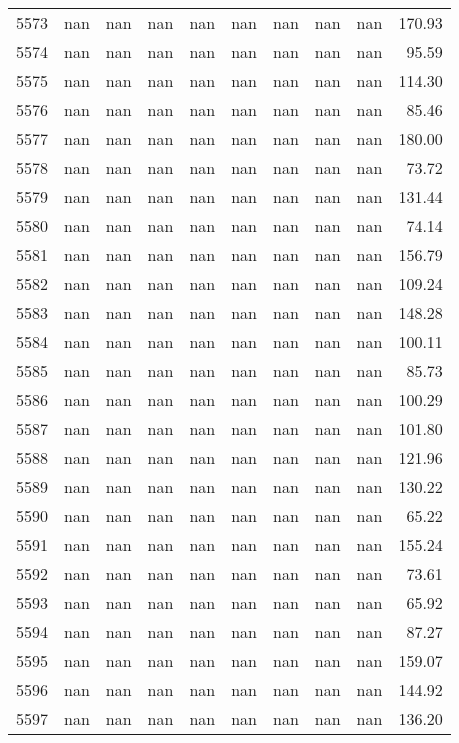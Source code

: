\begin{tabular}{lrrrrrrrrr}
5573 & nan & nan & nan & nan & nan & nan & nan & nan & 170.93 \\
5574 & nan & nan & nan & nan & nan & nan & nan & nan & 95.59 \\
5575 & nan & nan & nan & nan & nan & nan & nan & nan & 114.30 \\
5576 & nan & nan & nan & nan & nan & nan & nan & nan & 85.46 \\
5577 & nan & nan & nan & nan & nan & nan & nan & nan & 180.00 \\
5578 & nan & nan & nan & nan & nan & nan & nan & nan & 73.72 \\
5579 & nan & nan & nan & nan & nan & nan & nan & nan & 131.44 \\
5580 & nan & nan & nan & nan & nan & nan & nan & nan & 74.14 \\
5581 & nan & nan & nan & nan & nan & nan & nan & nan & 156.79 \\
5582 & nan & nan & nan & nan & nan & nan & nan & nan & 109.24 \\
5583 & nan & nan & nan & nan & nan & nan & nan & nan & 148.28 \\
5584 & nan & nan & nan & nan & nan & nan & nan & nan & 100.11 \\
5585 & nan & nan & nan & nan & nan & nan & nan & nan & 85.73 \\
5586 & nan & nan & nan & nan & nan & nan & nan & nan & 100.29 \\
5587 & nan & nan & nan & nan & nan & nan & nan & nan & 101.80 \\
5588 & nan & nan & nan & nan & nan & nan & nan & nan & 121.96 \\
5589 & nan & nan & nan & nan & nan & nan & nan & nan & 130.22 \\
5590 & nan & nan & nan & nan & nan & nan & nan & nan & 65.22 \\
5591 & nan & nan & nan & nan & nan & nan & nan & nan & 155.24 \\
5592 & nan & nan & nan & nan & nan & nan & nan & nan & 73.61 \\
5593 & nan & nan & nan & nan & nan & nan & nan & nan & 65.92 \\
5594 & nan & nan & nan & nan & nan & nan & nan & nan & 87.27 \\
5595 & nan & nan & nan & nan & nan & nan & nan & nan & 159.07 \\
5596 & nan & nan & nan & nan & nan & nan & nan & nan & 144.92 \\
5597 & nan & nan & nan & nan & nan & nan & nan & nan & 136.20 \\

\end{tabular}
